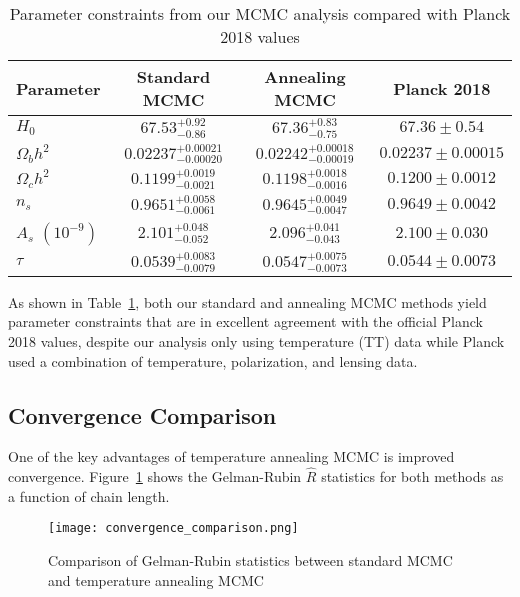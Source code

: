 \documentclass[11pt]{article}
\theoremstyle{definition}
\begin{document}
\begin{table}[h!]
  \centering
  \small
  \caption{Parameter constraints from our MCMC analysis compared with Planck 2018 values}
  \label{tab:constraints}
  \begin{tabular}{l c c c}
    \toprule
    \textbf{Parameter} & \textbf{Standard MCMC} & \textbf{Annealing MCMC} & \textbf{Planck 2018} \\
    \midrule
    $H_0$ & $67.53^{+0.92}_{-0.86}$ & $67.36^{+0.83}_{-0.75}$ & $67.36 \pm 0.54$ \\
    $\Omega_b h^2$ & $0.02237^{+0.00021}_{-0.00020}$ & $0.02242^{+0.00018}_{-0.00019}$ & $0.02237 \pm 0.00015$ \\
    $\Omega_c h^2$ & $0.1199^{+0.0019}_{-0.0021}$ & $0.1198^{+0.0018}_{-0.0016}$ & $0.1200 \pm 0.0012$ \\
    $n_s$ & $0.9651^{+0.0058}_{-0.0061}$ & $0.9645^{+0.0049}_{-0.0047}$ & $0.9649 \pm 0.0042$ \\
    $A_s$ $(10^{-9})$ & $2.101^{+0.048}_{-0.052}$ & $2.096^{+0.041}_{-0.043}$ & $2.100 \pm 0.030$ \\
    $\tau$ & $0.0539^{+0.0083}_{-0.0079}$ & $0.0547^{+0.0075}_{-0.0073}$ & $0.0544 \pm 0.0073$ \\
    \bottomrule
  \end{tabular}
\end{table}

As shown in Table~\ref{tab:constraints}, both our standard and annealing MCMC methods yield parameter constraints that are in excellent agreement with the official Planck 2018 values, despite our analysis only using temperature (TT) data while Planck used a combination of temperature, polarization, and lensing data.

\subsection{Convergence Comparison}

One of the key advantages of temperature annealing MCMC is improved convergence. Figure~\ref{fig:convergence} shows the Gelman-Rubin $\hat{R}$ statistics for both methods as a function of chain length.

\begin{figure}[htbp]
  \centering
  \texttt{[image: convergence\_comparison.png]}
  \caption{Comparison of Gelman-Rubin statistics between standard MCMC and temperature annealing MCMC}
  \label{fig:convergence}
\end{figure}
\end{document}
